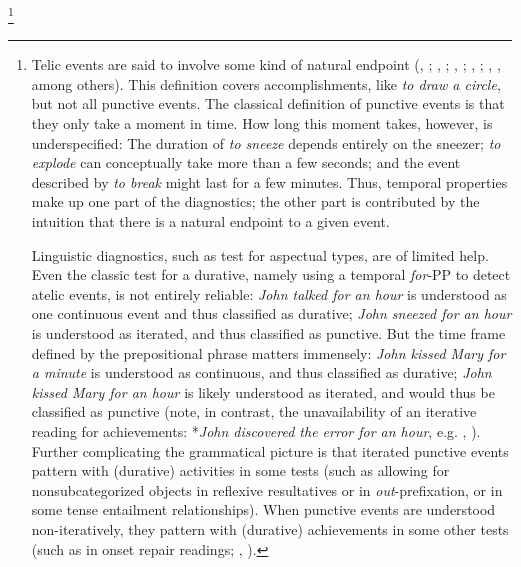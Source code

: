 \documentclass[review,12pt,authoryear]{elsarticle}
\begin{document}
\footnote{\label{aspectualdistinction}Telic events are said to involve some kind of natural endpoint (\citeauthor{andersson1972aktionalitat}, \citeyear{andersson1972aktionalitat}; \citeauthor{garey1957verbal}, \citeyear{garey1957verbal}; \citeauthor{bauer1970english}, \citeyear{bauer1970english}; \citeauthor{klein1994time}, \citeyear{klein1994time}; \citeauthor{Vendler1957}, \citeyear{Vendler1957}, among others). This definition covers accomplishments, like \emph{to draw a circle}, but not all punctive events. The classical definition of punctive events is that they only take a moment in time. How long this moment takes, however, is underspecified: The duration of \emph{to sneeze} depends entirely on the sneezer; \emph{to explode} can conceptually take more than a few seconds; and the event described by \emph{to break} might last for a few minutes. Thus, temporal properties make up one part of the diagnostics; the other part is contributed by the intuition that there is a natural endpoint to a given event.

Linguistic diagnostics, such as test for aspectual types, are of limited help. Even the classic test for a durative, namely using a temporal \emph{for}-PP to detect {atelic} events, is not entirely reliable: \emph{John talked for an hour} is understood as one continuous event and thus classified as durative; \emph{John sneezed for an hour} is understood as iterated, and thus classified as punctive. But the time frame defined by the prepositional phrase matters immensely: \emph{John kissed Mary for a minute} is understood as continuous, and thus classified as durative; \emph{John kissed Mary for an hour} is likely understood as iterated, and would thus be classified as punctive (note, in contrast, the unavailability of an iterative reading for achievements: *\emph{John discovered the error for an hour}, e.g. \citeauthor{bott2010}, \citeyear{bott2010}). Further complicating the grammatical picture is that iterated punctive events pattern with (durative) activities in some tests (such as allowing for nonsubcategorized objects in reflexive resultatives or in \emph{out}-prefixation, or in some tense entailment relationships). When punctive events are understood non-iteratively, they pattern with (durative) achievements in some other tests (such as in onset repair readings; \citeauthor{kearns2000semantics}, \citeyear{kearns2000semantics}).

}
\end{document}
